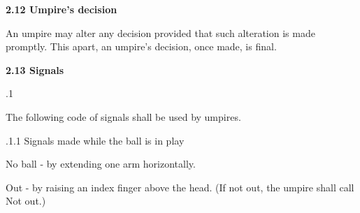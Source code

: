 \documentclass[12pt]{article}
\begin{document}
\vspace{\baselineskip}
{\fontsize{11pt}{13.2pt}\selectfont \textbf{2.12 \tabto{0.47in} Umpire’s decision}\par}\par


\vspace{\baselineskip}
\begin{adjustwidth}{0.0in}{0.19in}
{\fontsize{9pt}{10.8pt}\selectfont An umpire may alter any decision provided that such alteration is made promptly. This apart, an umpire’s decision, once made, is final.\par}\par

\end{adjustwidth}


\vspace{\baselineskip}
{\fontsize{11pt}{13.2pt}\selectfont \textbf{2.13 \tabto{0.47in} Signals}\par}\par


\vspace{\baselineskip}
{\fontsize{9pt}{10.8pt}.1 \tabto{0.49in} {\fontsize{8pt}{9.6pt}\selectfont The following code of signals shall be used by umpires.\par}\par}\par


\vspace{\baselineskip}
\begin{adjustwidth}{0.49in}{0.0in}
{\fontsize{9pt}{10.8pt}.1.1 \tabto{1.17in} Signals made while the ball is in play\par}\par

\end{adjustwidth}


\vspace{\baselineskip}
\begin{adjustwidth}{1.0in}{0.0in}
{\fontsize{9pt}{10.8pt}\selectfont No ball - by extending one arm horizontally.\par}\par

\end{adjustwidth}


\vspace{\baselineskip}
\begin{adjustwidth}{1.0in}{0.0in}
{\fontsize{9pt}{10.8pt}\selectfont Out - by raising an index finger above the head. (If not out, the umpire shall call Not out.)\par}\par

\end{adjustwidth}
\end{document}
